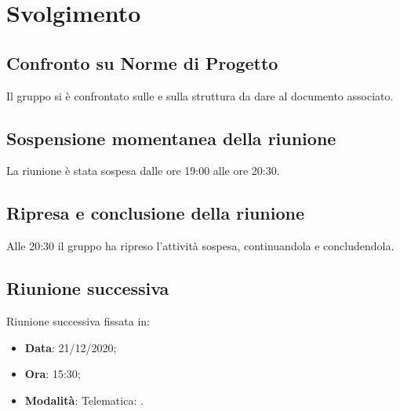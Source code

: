 \documentclass[]{article}
\begin{document}
	\newpage

	\section{Svolgimento}
		\subsection{Confronto su Norme di Progetto}
		Il gruppo si è confrontato sulle  e sulla struttura da dare al documento associato.\\

		\subsection{Sospensione momentanea della riunione}
		La riunione è stata sospesa dalle ore 19:00 alle ore 20:30.\\
		
		\subsection{Ripresa e conclusione della riunione}
		Alle 20:30 il gruppo ha ripreso l'attività sospesa, continuandola e concludendola.\\

		\subsection{Riunione successiva}
		Riunione successiva fissata in:
		\begin{itemize}
			\item \textbf{Data}: 21/12/2020;
			\item \textbf{Ora}: 15:30;
			\item \textbf{Modalità}: Telematica: .
		\end{itemize}

	
\end{document}
